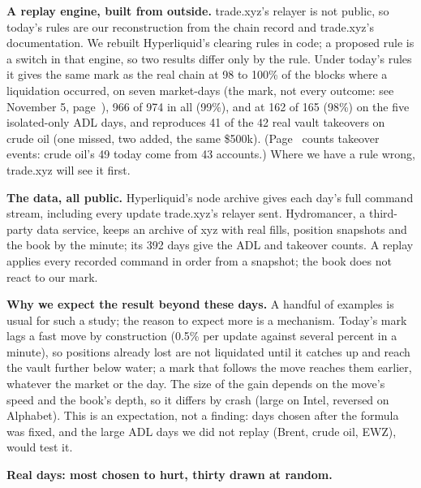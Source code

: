 \label{sec:tests}

\textbf{A replay engine, built from outside.} trade.xyz's relayer is not public, so today's rules are our reconstruction from the chain record and trade.xyz's documentation. We rebuilt Hyperliquid's clearing rules in code; a proposed rule is a switch in that engine, so two results differ only by the rule. Under today's rules it gives the same mark as the real chain at 98 to 100\% of the blocks where a liquidation occurred, on seven market-days (the mark, not every outcome: see November 5, page~\pageref{sec:users}), 966 of 974 in all (99\%), and at 162 of 165 (98\%) on the five isolated-only ADL days, and reproduces 41 of the 42 real vault takeovers on crude oil (one missed, two added, the same \$500k). (Page~\pageref{sec:res-mark} counts takeover events: crude oil's 49 today come from 43 accounts.) Where we have a rule wrong, trade.xyz will see it first.

\textbf{The data, all public.} Hyperliquid's node archive gives each day's full command stream, including every update trade.xyz's relayer sent. Hydromancer, a third-party data service, keeps an archive of xyz with real fills, position snapshots and the book by the minute; its 392 days give the ADL and takeover counts. A replay applies every recorded command in order from a snapshot; the book does not react to our mark.

\textbf{Why we expect the result beyond these days.} A handful of examples is usual for such a study; the reason to expect more is a mechanism. Today's mark lags a fast move by construction (0.5\% per update against several percent in a minute), so positions already lost are not liquidated until it catches up and reach the vault further below water; a mark that follows the move reaches them earlier, whatever the market or the day. The size of the gain depends on the move's speed and the book's depth, so it differs by crash (large on Intel, reversed on Alphabet). This is an expectation, not a finding: days chosen after the formula was fixed, and the large ADL days we did not replay (Brent, crude oil, EWZ), would test it.

\textbf{Real days: most chosen to hurt, thirty drawn at random.}

